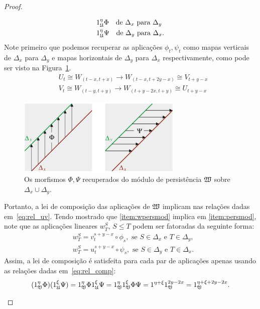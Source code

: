 \begin{proof}
\begin{enumerate}
\begin{align*}
        & 1^\eta_{\mathfrak{U}}\Phi \quad \text{de } \Delta_x \text{ para } \Delta_y \\
        & 1^\eta_{\mathfrak{U}}\Psi \quad \text{de } \Delta_y \text{ para } \Delta_x.
    \end{align*}
    Note primeiro que podemos recuperar as aplicações $\phi_t, \psi_t$ como mapas verticais 
    de $\Delta_x$ para $\Delta_y$ e mapas horizontais de $\Delta_y$ para $\Delta_x$ respectivamente,
    como pode ser visto na Figura~\ref{fig:verthoriz}.
    \begin{align*}
        & U_t \cong W_{(t-x, t+x)} \to W_{(t-x, t+2y-x)} \cong V_{t+y-x} \\
        & V_t \cong W_{(t-y, t+y)} \to W_{(t+y-2x, t+y)} \cong U_{t+y-x}  
    \end{align*}
    \begin{figure}[bthp!]
        \centering
        \includegraphics[width=0.7\textwidth]{images/wrecovermaps.png}
        \caption{Os morfismos $\Phi, \Psi$ recuperados do módulo de persistência $\mathfrak{W}$ sobre
                 $\Delta_x \cup \Delta_y$.}  
        \label{fig:verthoriz}
    \end{figure}
    Portanto, a lei de composição das aplicações de $\mathfrak{W}$ implicam nas relações
    dadas em~\eqref{eq:rel_uv}. 
    Tendo mostrado que \ref{item:wpersmod} implica em \ref{item:persmod}, note que 
    as aplicações lineares $w^S_T$, $S\leq T$ podem ser fatoradas da seguinte forma:
    \begin{equation}\label{eq:rel_comp}
        \begin{split}
            & w^S_T = v^{s+y-x}_t \circ \phi_s, \text{ se } S \in \Delta_x \text{ e } T \in \Delta_y, \\
            & w^S_T = u^{s+y-x}_t \circ \psi_s, \text{ se } S \in \Delta_y \text{ e } T \in \Delta_x.
        \end{split}
    \end{equation}
    Assim, a lei de composição é satisfeita para cada par de aplicações apenas usando as relações
    dadas em~\eqref{eq:rel_comp}:
    \begin{equation*}
        (1^\eta_{\mathfrak{V}} \Phi) (1^\xi_{\mathfrak{U}} \Psi) = 1^\eta_{\mathfrak{V}} \Phi 1^\xi_{\mathfrak{U}} \Psi
        = 1^\eta_{\mathfrak{V}} 1^\xi_{\mathfrak{V}} \Phi \Psi = 1^{\eta+\xi} 1^{2y-2x}_{\mathfrak{V}} = 
        1^{\eta+\xi+2y-2x}_{\mathfrak{V}}.
    \end{equation*}
\end{enumerate}
\end{proof}

